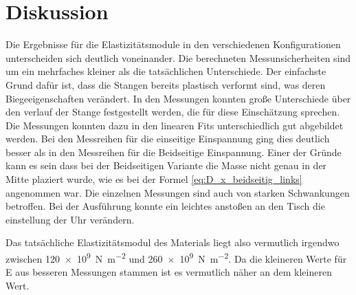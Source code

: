 
\section{Diskussion}
Die Ergebnisse für die Elastizitätsmodule in den  verschiedenen Konfigurationen
unterscheiden sich deutlich voneinander. Die berechneten Messunsicherheiten sind
um ein mehrfaches kleiner als die tatsächlichen Unterschiede.
Der einfachste Grund dafür ist, dass die Stangen bereits plastisch verformt sind,
was deren Biegeeigenschaften verändert.
In den Messungen konnten große Unterschiede über den verlauf der Stange festgestellt werden,
die für diese Einschätzung sprechen.
Die Messungen konnten dazu in den linearen Fits unterschiedlich gut abgebildet werden.
Bei den Messreihen für die einseitige Einspannung ging dies deutlich besser als in
den Messreihen für die Beidseitige Einspannung.
Einer der Gründe kann es sein dass bei der Beidseitigen Variante die Masse nicht
genau in der Mitte plaziert wurde, wie es bei der Formel \eqref{eq:D_x_beidseitig_links} angenommen war.
Die einzelnen Messungen sind auch von starken Schwankungen betroffen.
Bei der Ausführung konnte ein leichtes anstoßen an den Tisch die einstellung der Uhr verändern.

Das tatsächliche Elastizitätsmodul des Materials liegt also vermutlich irgendwo 
zwischen \qty{120 e9}{\newton\per\square\meter} und \qty{260 e9}{\newton\per\square\meter}.
Da die kleineren Werte für E aus besseren Messungen stammen ist es vermutlich näher an dem kleineren Wert.